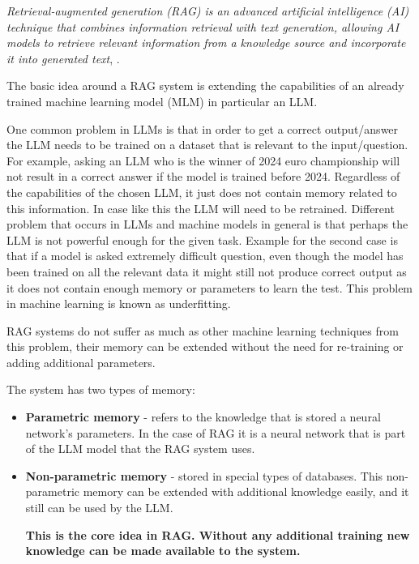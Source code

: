 \documentclass{wseas}
\begin{document}
\emph{Retrieval-augmented generation (RAG) is an advanced
 artificial intelligence (AI) technique that combines information 
 retrieval with text generation, allowing AI models to retrieve 
 relevant information from a knowledge source and incorporate it 
 into generated text}, \cite{website_deffinition_rag}.


The basic idea around a RAG system is extending the capabilities of an
already trained machine learning model (MLM) in particular an LLM.

One common problem in LLMs is that in order to get a correct output/answer
the LLM needs to be trained on a dataset that is relevant to the
input/question. For example, asking an LLM who is the winner of 2024
euro championship will not result in a correct answer if the model is
trained before 2024. Regardless of the capabilities of the chosen LLM,
it just does not contain memory related to this information. In case
like this the LLM will need to be retrained. Different problem that
occurs in LLMs and machine models in general is that perhaps the LLM is
not powerful enough for the given task. Example for the second case is
that if a model is asked extremely difficult question, even though the
model has been trained on all the relevant data it might still not
produce correct output as it does not contain enough memory or parameters
to learn the test. This problem in machine learning is known as underfitting.

RAG systems do not suffer as much as other machine learning techniques 
from this problem, their memory can be extended without the need for 
re-training or adding additional parameters. 

The system has two types of memory:

\begin{itemize}

\item
  \textbf{Parametric memory} - refers to the knowledge that is stored a neural network's parameters.
  In the case of RAG it is a neural network that is part of the LLM model that the RAG system uses.
\item
  \textbf{Non-parametric memory} - stored in special types of databases.
  This non-parametric memory can be extended with additional knowledge
  easily, and it still can be used by the LLM.

  \textbf{This is the core
  idea in RAG. Without any additional training new knowledge can be made
  available to the system.}
\end{itemize}
\end{document}
